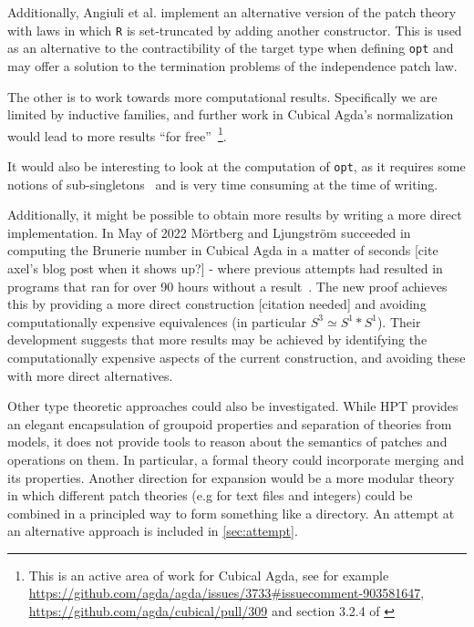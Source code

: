 Additionally, Angiuli et al. implement an alternative version of the patch
theory with laws in which \texttt{R} is set-truncated by adding another
constructor. This is used as an alternative to the contractibility of the target
type when defining \texttt{opt} and may offer a solution to the termination
problems of the independence patch law.

The other is to work towards more computational results.
Specifically we are limited by inductive families, and further work in Cubical
Agda's normalization would lead to more results ``for free''~\footnote{This is
  an active area of work for Cubical Agda, see for example
  \url{https://github.com/agda/agda/issues/3733\#issuecomment-903581647},
  \url{https://github.com/agda/cubical/pull/309} and section 3.2.4 of \cite{vezzosi2021cubical}}.

It would also be interesting to look at the computation of \texttt{opt}, as it requires some
notions of sub-singletons~\cite{Angiuli2016} and is very time consuming at the
time of writing.

Additionally, it might be possible to obtain more results by writing a more
direct implementation. In May of 2022 M\"ortberg and Ljungstr\"om succeeded in
computing the Brunerie number in Cubical Agda in a matter of seconds [cite
axel's blog post when it shows up?] - where previous attempts had resulted in
programs that ran for over 90 hours without a result~\cite{mortberg2018}. The
new proof achieves this by providing a more direct construction [citation
needed] and avoiding computationally expensive equivalences (in particular $S^3
\simeq S^1 \ast S^1$). Their development suggests that more results may be
achieved by identifying the computationally expensive aspects of the current
construction, and avoiding these with more direct alternatives.

Other type theoretic approaches could also be investigated. While HPT provides
an elegant encapsulation of groupoid properties and separation of theories from
models, it does not provide tools to reason about the semantics of patches and
operations on them. In particular, a formal theory could incorporate merging and
its properties. Another direction for expansion would be a more modular theory
in which different patch theories (e.g for text files and integers) could be
combined in a principled way to form something like a directory.
An attempt at an alternative approach is included in \autoref{sec:attempt}.